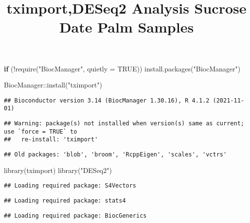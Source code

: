 \documentclass[
]{article}
\title{tximport,DESeq2 Analysis Sucrose Date Palm Samples}
\author{}
\date{\vspace{-2.5em}}
\newenvironment{Shaded}{\begin{snugshade}}{\end{snugshade}}
\newcommand{\AttributeTok}[1]{\textcolor[rgb]{0.77,0.63,0.00}{#1}}
\newcommand{\ConstantTok}[1]{\textcolor[rgb]{0.00,0.00,0.00}{#1}}
\newcommand{\ControlFlowTok}[1]{\textcolor[rgb]{0.13,0.29,0.53}{\textbf{#1}}}
\newcommand{\FunctionTok}[1]{\textcolor[rgb]{0.00,0.00,0.00}{#1}}
\newcommand{\NormalTok}[1]{#1}
\newcommand{\SpecialCharTok}[1]{\textcolor[rgb]{0.00,0.00,0.00}{#1}}
\newcommand{\StringTok}[1]{\textcolor[rgb]{0.31,0.60,0.02}{#1}}
\begin{document}
\maketitle

\begin{Shaded}
\begin{Highlighting}[]
\ControlFlowTok{if}\NormalTok{ (}\SpecialCharTok{!}\FunctionTok{require}\NormalTok{(}\StringTok{"BiocManager"}\NormalTok{, }\AttributeTok{quietly =} \ConstantTok{TRUE}\NormalTok{))}
    \FunctionTok{install.packages}\NormalTok{(}\StringTok{"BiocManager"}\NormalTok{)}

\NormalTok{BiocManager}\SpecialCharTok{::}\FunctionTok{install}\NormalTok{(}\StringTok{"tximport"}\NormalTok{)}
\end{Highlighting}
\end{Shaded}

\begin{verbatim}
## Bioconductor version 3.14 (BiocManager 1.30.16), R 4.1.2 (2021-11-01)
\end{verbatim}

\begin{verbatim}
## Warning: package(s) not installed when version(s) same as current; use `force = TRUE` to
##   re-install: 'tximport'
\end{verbatim}

\begin{verbatim}
## Old packages: 'blob', 'broom', 'RcppEigen', 'scales', 'vctrs'
\end{verbatim}

\begin{Shaded}
\begin{Highlighting}[]
\FunctionTok{library}\NormalTok{(}\StringTok{\textquotesingle{}tximport\textquotesingle{}}\NormalTok{)}
\FunctionTok{library}\NormalTok{(}\StringTok{"DESeq2"}\NormalTok{)}
\end{Highlighting}
\end{Shaded}

\begin{verbatim}
## Loading required package: S4Vectors
\end{verbatim}

\begin{verbatim}
## Loading required package: stats4
\end{verbatim}

\begin{verbatim}
## Loading required package: BiocGenerics
\end{verbatim}
\end{document}
